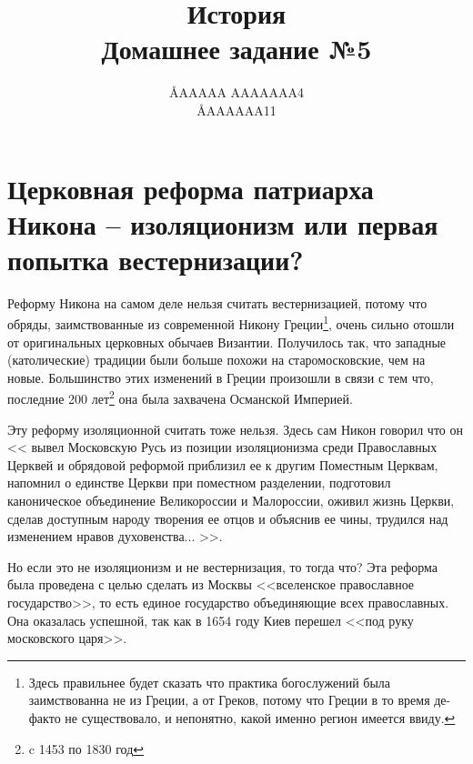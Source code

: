 \documentclass[12pt]{article}
\title{История \\ Домашнее задание №5}
\author{\AA{AAAAA AAAAAAA}{4} \\ \AA{AAAAAA}{11}}
\begin{document}
  \maketitle

  \section{Церковная реформа патриарха Никона -- изоляционизм\protect\footnotemark{} или первая попытка вестернизации\protect\footnotemark{}?}
  \addtocounter{footnote}{-2}

  Реформу Никона на самом деле нельзя считать вестернизацией, потому что обряды,
  заимствованные из современной Никону Греции\footnote{
    Здесь правильнее будет сказать что практика богослужений была заимствованна не из Греции,
    а от Греков, потому что Греции в то время де-факто не существовало,
    и непонятно, какой именно регион имеется ввиду.
  },
  очень сильно отошли от оригинальных церковных обычаев Византии.
  Получилось так, что западные (католические) традиции были больше похожи на старо\-московские, чем на новые.
  Большинство этих изменений в Греции произошли в связи с тем что,
  последние 200 лет\footnote{c 1453 по 1830 год} она была захвачена Османской Империей.

  Эту реформу изоляционной считать тоже нельзя.
  Здесь сам Никон говорил что он <<%
    вывел Московскую Русь из позиции изоляционизма среди Православных Церквей и обрядовой реформой приблизил ее к другим Поместным Церквам,
    напомнил о единстве Церкви при поместном разделении,
    подготовил каноническое объединение Великороссии и Малороссии,
    оживил жизнь Церкви, сделав доступным народу творения ее отцов и объяснив ее чины,
    трудился над изменением нравов духовенства...%
  >>.

  Но если это не изоляционизм и не вестернизация, то тогда что?
  Эта реформа была проведена с целью сделать из Москвы <<вселенское православное государство>>,
  то есть единое государство объединяющие всех православных.
  Она оказалась успешной, так как в 1654 году Киев перешел <<под руку московского царя>>.
\end{document}
